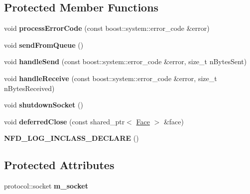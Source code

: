 \subsection*{Protected Member Functions}
\begin{DoxyCompactItemize}
\item 
void {\bfseries process\+Error\+Code} (const boost\+::system\+::error\+\_\+code \&error)\hypertarget{classnfd_1_1StreamFace_aa2a0b2969f5d8af4526dda103a01ff88}{}\label{classnfd_1_1StreamFace_aa2a0b2969f5d8af4526dda103a01ff88}

\item 
void {\bfseries send\+From\+Queue} ()\hypertarget{classnfd_1_1StreamFace_aa49e643da901e6078420bfbb5ed256e3}{}\label{classnfd_1_1StreamFace_aa49e643da901e6078420bfbb5ed256e3}

\item 
void {\bfseries handle\+Send} (const boost\+::system\+::error\+\_\+code \&error, size\+\_\+t n\+Bytes\+Sent)\hypertarget{classnfd_1_1StreamFace_a948fcfefa70cb4fc4fd277b1319fdc85}{}\label{classnfd_1_1StreamFace_a948fcfefa70cb4fc4fd277b1319fdc85}

\item 
void {\bfseries handle\+Receive} (const boost\+::system\+::error\+\_\+code \&error, size\+\_\+t n\+Bytes\+Received)\hypertarget{classnfd_1_1StreamFace_a802c2bcf579af5d7627cc9e8a7ce27ce}{}\label{classnfd_1_1StreamFace_a802c2bcf579af5d7627cc9e8a7ce27ce}

\item 
void {\bfseries shutdown\+Socket} ()\hypertarget{classnfd_1_1StreamFace_ab16743153960fea254e368e1adf3d108}{}\label{classnfd_1_1StreamFace_ab16743153960fea254e368e1adf3d108}

\item 
void {\bfseries deferred\+Close} (const shared\+\_\+ptr$<$ \hyperlink{classnfd_1_1Face}{Face} $>$ \&face)\hypertarget{classnfd_1_1StreamFace_a044b3b02dc9b524b983959f9699fa54d}{}\label{classnfd_1_1StreamFace_a044b3b02dc9b524b983959f9699fa54d}

\item 
{\bfseries N\+F\+D\+\_\+\+L\+O\+G\+\_\+\+I\+N\+C\+L\+A\+S\+S\+\_\+\+D\+E\+C\+L\+A\+RE} ()\hypertarget{classnfd_1_1StreamFace_a3a186264aa2e798c72e14773ff14df4e}{}\label{classnfd_1_1StreamFace_a3a186264aa2e798c72e14773ff14df4e}

\end{DoxyCompactItemize}
\subsection*{Protected Attributes}
\begin{DoxyCompactItemize}
\item 
protocol\+::socket {\bfseries m\+\_\+socket}\hypertarget{classnfd_1_1StreamFace_a5aa7f908c106e69ab9b3a668a9b5af03}{}\label{classnfd_1_1StreamFace_a5aa7f908c106e69ab9b3a668a9b5af03}

\end{DoxyCompactItemize}
